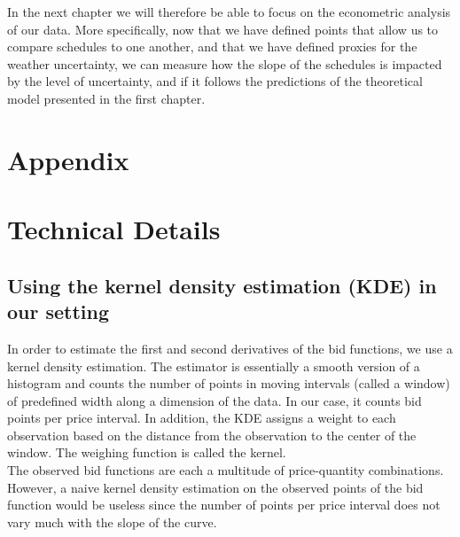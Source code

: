 In the next chapter we will therefore be able to focus on the econometric analysis of our data. More specifically, now that we have defined points that allow us to compare schedules to one another, and that we have defined proxies for the weather uncertainty, we can measure how the slope of the schedules is impacted by the level of uncertainty, and if it follows the predictions of the theoretical model presented in the first chapter.

\newpage
\begin{subappendices}
\section*{Appendix}

\section{Technical Details}
\label{Techdetails}

\subsection{Using the kernel density estimation (KDE) in our setting}
\label{implementingkernel}
In order to estimate the first and second derivatives of the bid functions, we use a kernel density estimation. The estimator is essentially a smooth version of a histogram and counts the number of points in moving intervals (called a window) of predefined width along a dimension of the data. In our case, it counts bid points per price interval. In addition, the KDE assigns a weight to each observation based on the distance from the observation to the center of the window. The weighing function is called the kernel. \\

The observed bid functions are each a multitude of price-quantity combinations. However, a naive kernel density estimation on the observed points of the bid function would be useless since the number of points per price interval does not vary much with the slope of the curve. \\


\end{subappendices}
